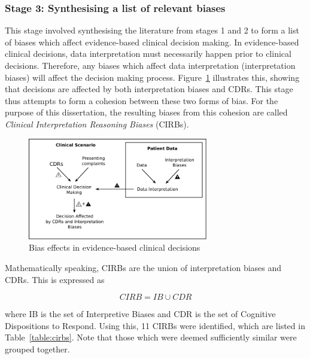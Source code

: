 \documentclass[a4paper]{scrartcl}     %
\begin{document}
  \subsubsection*{Stage 3: Synthesising a list of relevant biases}

    This stage involved synthesising the literature from stages 1 and 2 to form a list of biases which affect evidence-based clinical decision making. In evidence-based clinical decisions, data interpretation must necessarily happen prior to clinical decisions. Therefore, any biases which affect data interpretation (interpretation biases) will affect the decision making process. Figure~\ref{fig:clinicdata} illustrates this, showing that decisions are affected by both interpretation biases and CDRs. This stage thus attempts to form a cohesion between these two forms of bias. For the purpose of this dissertation, the resulting biases from this cohesion are called \textit{Clinical Interpretation Reasoning Biases} (CIRBs).

    \begin{figure}[htb]
      \centering
      \includegraphics[width=0.7\textwidth]{images/clinic+data.pdf}
      \caption{Bias effects in evidence-based clinical decisions}
      \label{fig:clinicdata}
    \end{figure}


    Mathematically speaking, CIRBs are the union of interpretation biases and CDRs. This is expressed as

    $$ CIRB = IB \cup CDR $$

    \noindent where IB is the set of Interpretive Biases and CDR is the set of Cognitive Dispositions to Respond. Using this, 11 CIRBs were identified, which are listed in Table~\ref{table:cirbs}. Note that those which were deemed sufficiently similar were grouped together.
\end{document}
